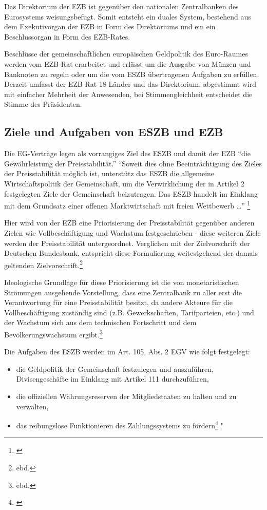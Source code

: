 \documentclass[
  onecolumn,
  a4paper,
  abstracton,
  parskip=half
  ,final
  ]{scrartcl}
\begin{document}
Das Direktorium der EZB ist gegen{\"u}ber den nationalen Zentralbanken des Eurosystems weisungsbefugt. Somit entsteht ein duales System, bestehend aus dem Exekutivorgan der EZB in Form des Direktoriums und ein ein Beschlussorgan in Form des EZB-Rates.
 
Beschl{\"u}sse der gemeinschaftlichen europ{\"a}ischen Geldpolitik des Euro-Raumes werden vom EZB-Rat erarbeitet und erl{\"a}sst um die Ausgabe von M{\"u}nzen und Banknoten zu regeln oder um die vom ESZB {\"u}bertragenen Aufgaben zu erf{\"u}llen. \citep[vgl.][S.553]{Basseler2010} 
Derzeit umfasst der EZB-Rat 18 L{\"a}nder und das Direktorium, abgestimmt wird mit einfacher Mehrheit der Anwesenden, bei Stimmengleichheit entscheidet die Stimme des Pr{\"a}sidenten.


\subsection{Ziele und Aufgaben von ESZB und EZB}
Die EG-Vertr{\"a}ge legen als vorrangiges Ziel des ESZB und damit der EZB "`die Gew{\"a}hrleistung der Preisstabilit{\"a}t."'
"`Soweit dies ohne Beeintr{\"a}chtigung des Zieles der Preisstabilit{\"a}t m{\"o}glich ist, unterst{\"u}tz das ESZB die allgemeine Wirtschaftspolitik der Gemeinschaft, um die Verwirklichung der in Artikel 2 festgelegten Ziele der Gemeinschaft beizutragen. Das ESZB handelt im Einklang mit dem Grundsatz einer offenen Marktwirtschaft mit freien Wettbewerb \ldots"' \footnote[48]{\citep[vgl.][S.554]{Basseler2010}}

Hier wird von der EZB eine Priorisierung der Preisstabilit{\"a}t gegen{\"u}ber anderen Zielen wie Vollbesch{\"a}ftigung und Wachstum festgeschrieben - diese weiteren Ziele werden der Preisstabilit{\"a}t untergeordnet. Verglichen mit der Zielvorschrift der Deutschen Bundesbank, entspricht diese Formulierung weitestgehend der damals geltenden Zielvorschrift.\footnote[49]{ebd.}

Ideologische Grundlage f{\"u}r diese Priorisierung ist die von monetaristischen Str{\"o}mungen ausgehende Vorstellung, dass eine Zentralbank zu aller erst die Verantwortung f{\"u}r eine Preisstabilit{\"a}t besitzt, da andere Akteure f{\"u}r die Vollbesch{\"a}ftigung zust{\"a}ndig sind (z.B. Gewerkschaften, Tarifparteien, etc.) und der Wachstum sich aus dem technischen Fortschritt und dem Bev{\"o}lkerungswachstum ergibt.\footnote[50]{ebd.}

Die Aufgaben des ESZB werden im Art. 105, Abs. 2 EGV wie folgt festgelegt:
\begin{itemize}
  \item{die Geldpolitik der Gemeinschaft festzulegen und auszuf{\"u}hren, Divisengesch{\"a}fte im Einklang mit Artikel 111 durchzuf{\"u}hren,}
  \item{die offiziellen W{\"a}hrungsreserven der Mitgliedstaaten zu halten und zu verwalten,}
  \item{das reibungslose Funktionieren des Zahlungssystems zu f{\"o}rdern}\footnote[50]{\citep[vgl.][S.555]{Basseler2010}} "
\end{itemize} 
\end{document}
